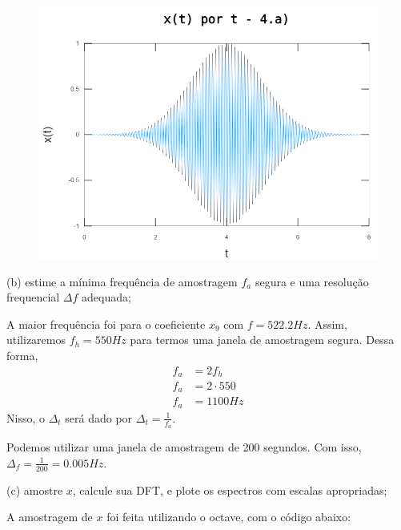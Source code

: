 \documentclass[10pt]{article}
\begin{document}
\begin{figure}[h]
    \includegraphics[scale=0.6]{questao4a}
    \centering
\end{figure}

(b) estime a mínima frequência de amostragem $f_a$ segura e uma resolução frequencial $\Delta f$ adequada;

A maior frequência foi para o coeficiente $x_9$ com $f = 522.2 Hz$. Assim, utilizaremos $f_h = 550 Hz$ para termos uma janela de amostragem segura. Dessa forma,
\begin{align*}
    f_a &= 2f_h\\
    f_a &= 2 \cdot 550\\
    f_a &= 1100 Hz
\end{align*}
Nisso, o $\Delta_t$ será dado por $\Delta_t = \frac{1}{f_a}$.

Podemos utilizar uma janela de amostragem de 200 segundos. Com isso, $\Delta_f = \frac{1}{200} = 0.005 Hz$.

(c) amostre $x$, calcule sua DFT, e plote os espectros com escalas apropriadas;

A amostragem de $x$ foi feita utilizando o octave, com o código abaixo:
\end{document}
